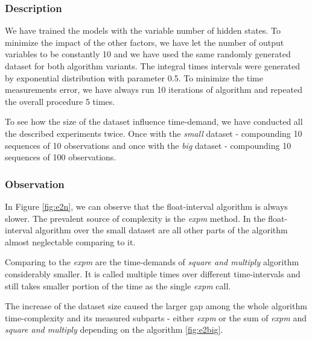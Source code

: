 \documentclass[thesis=M,english]{FITthesis}[2012/10/20]
\begin{document}
\subsubsection*{ Description }

We have trained the models with the variable number of hidden states. To minimize the impact of the other factors, we have let the number of output variables to be constantly 10 and we have used the same randomly generated dataset for both algorithm variants. The integral times intervals were generated by exponential distribution with parameter 0.5. To minimize the time measurements error, we have always run 10 iterations of algorithm and repeated the overall procedure 5 times. 

To see how the size of the dataset influence time-demand, we have conducted all the described experiments twice. Once with the \textit{small} dataset - compounding 10 sequences of 10 observations and once with the \textit{big} dataset - compounding 10 sequences of 100 observations.  

\subsubsection*{ Observation }

In Figure \ref{fig:e2n}, we can observe that the float-interval algorithm is always slower. The prevalent source of complexity is the \textit{expm} method. In the float-interval algorithm over the small dataset are all other parts of the algorithm almost neglectable comparing to it.

Comparing to the \textit{expm} are the time-demands of \textit{square and multiply} algorithm considerably smaller. It is called multiple times over different time-intervals and still takes smaller portion of the time as the single \textit{expm} call.

The increase of the dataset size caused the larger gap among the whole algorithm time-complexity and its measured subparts - either \textit{expm} or the sum of \textit{expm} and \textit{square and multiply} depending on the algorithm \ref{fig:e2big}.   
\end{document}

